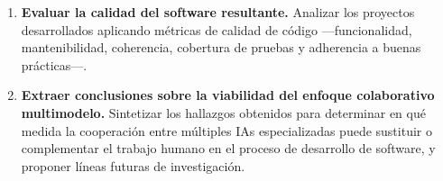 \begin{enumerate}
  \item \textbf{Evaluar la calidad del software resultante.} Analizar los proyectos desarrollados aplicando métricas de calidad de código ---funcionalidad, mantenibilidad, coherencia, cobertura de pruebas y adherencia a buenas prácticas---.

  \item \textbf{Extraer conclusiones sobre la viabilidad del enfoque colaborativo multimodelo.} Sintetizar los hallazgos obtenidos para determinar en qué medida la cooperación entre múltiples IAs especializadas puede sustituir o complementar el trabajo humano en el proceso de desarrollo de software, y proponer líneas futuras de investigación.
\end{enumerate}


